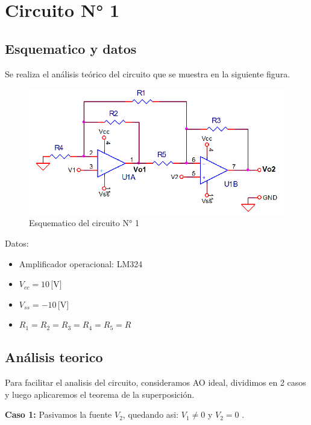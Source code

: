 \section{Circuito N° 1}



\subsection{Esquematico y datos}

Se realiza el análisis teórico del circuito que se muestra en la siguiente figura. 
 

\begin{figure}[h!]
    \centering
    \includegraphics[width=0.80\linewidth]{Secciones/Circuito1/esquematico.png}
    \caption{Esquematico del circuito N° 1}
    \label{fig:esquematico}
\end{figure}

Datos:

\begin{itemize}
  \item Amplificador operacional: LM324
  \item $V_{cc} = 10 \, \text{[V]}$
  \item $V_{ss} = -10 \, \text{[V]}$
  \item $R_1 = R_2 = R_3 = R_4 = R_5 = R$
\end{itemize}

\subsection{Análisis teorico}
Para facilitar el analisis del circuito, consideramos AO ideal, dividimos en 2 casos y luego aplicaremos el teorema de la superposición.

\vspace{1em}

\textbf{Caso 1:} Pasivamos la fuente $V_2$, quedando asi: $V_1 \neq 0 $ y $V_2 = 0$ .

\vspace{1em}

